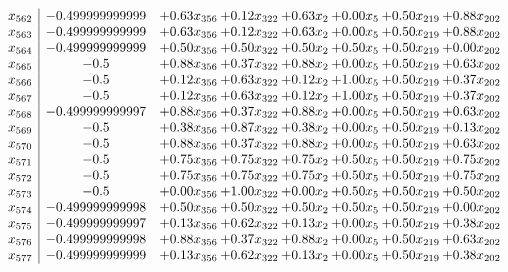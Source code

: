 \documentclass[8pt]{article}
\begin{document}
\[\begin{array}{c| c c@{\hskip 2pt} c@{\hskip 2pt} c@{\hskip 2pt} c@{\hskip 2pt} c@{\hskip 2pt} c@{\hskip 2pt} }
 x_{562}   &  -0.499999999999 & +  0.63 x_{356} & +  0.12 x_{322} & +  0.63 x_{2} & +  0.00 x_{5} & +  0.50 x_{219} & +  0.88 x_{202}\\
 x_{563}   &  -0.499999999999 & +  0.63 x_{356} & +  0.12 x_{322} & +  0.63 x_{2} & +  0.00 x_{5} & +  0.50 x_{219} & +  0.88 x_{202}\\
 x_{564}   &  -0.499999999999 & +  0.50 x_{356} & +  0.50 x_{322} & +  0.50 x_{2} & +  0.50 x_{5} & +  0.50 x_{219} & +  0.00 x_{202}\\
 x_{565}   &  -0.5 & +  0.88 x_{356} & +  0.37 x_{322} & +  0.88 x_{2} & +  0.00 x_{5} & +  0.50 x_{219} & +  0.63 x_{202}\\
 x_{566}   &  -0.5 & +  0.12 x_{356} & +  0.63 x_{322} & +  0.12 x_{2} & +  1.00 x_{5} & +  0.50 x_{219} & +  0.37 x_{202}\\
 x_{567}   &  -0.5 & +  0.12 x_{356} & +  0.63 x_{322} & +  0.12 x_{2} & +  1.00 x_{5} & +  0.50 x_{219} & +  0.37 x_{202}\\
 x_{568}   &  -0.499999999997 & +  0.88 x_{356} & +  0.37 x_{322} & +  0.88 x_{2} & +  0.00 x_{5} & +  0.50 x_{219} & +  0.63 x_{202}\\
 x_{569}   &  -0.5 & +  0.38 x_{356} & +  0.87 x_{322} & +  0.38 x_{2} & +  0.00 x_{5} & +  0.50 x_{219} & +  0.13 x_{202}\\
 x_{570}   &  -0.5 & +  0.88 x_{356} & +  0.37 x_{322} & +  0.88 x_{2} & +  0.00 x_{5} & +  0.50 x_{219} & +  0.63 x_{202}\\
 x_{571}   &  -0.5 & +  0.75 x_{356} & +  0.75 x_{322} & +  0.75 x_{2} & +  0.50 x_{5} & +  0.50 x_{219} & +  0.75 x_{202}\\
 x_{572}   &  -0.5 & +  0.75 x_{356} & +  0.75 x_{322} & +  0.75 x_{2} & +  0.50 x_{5} & +  0.50 x_{219} & +  0.75 x_{202}\\
 x_{573}   &  -0.5 & +  0.00 x_{356} & +  1.00 x_{322} & +  0.00 x_{2} & +  0.50 x_{5} & +  0.50 x_{219} & +  0.50 x_{202}\\
 x_{574}   &  -0.499999999998 & +  0.50 x_{356} & +  0.50 x_{322} & +  0.50 x_{2} & +  0.50 x_{5} & +  0.50 x_{219} & +  0.00 x_{202}\\
 x_{575}   &  -0.499999999997 & +  0.13 x_{356} & +  0.62 x_{322} & +  0.13 x_{2} & +  0.00 x_{5} & +  0.50 x_{219} & +  0.38 x_{202}\\
 x_{576}   &  -0.499999999998 & +  0.88 x_{356} & +  0.37 x_{322} & +  0.88 x_{2} & +  0.00 x_{5} & +  0.50 x_{219} & +  0.63 x_{202}\\
 x_{577}   &  -0.499999999999 & +  0.13 x_{356} & +  0.62 x_{322} & +  0.13 x_{2} & +  0.00 x_{5} & +  0.50 x_{219} & +  0.38 x_{202}\\

\end{array}\]
\end{document}
